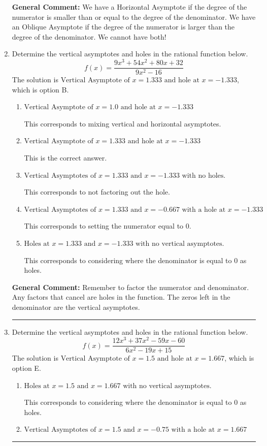 \documentclass{extbook}[14pt]
\newcommand{\litem}[1]{\item #1

\rule{\textwidth}{0.4pt}}
\begin{document}
\begin{enumerate}
{\textbf{General Comment:} We have a Horizontal Asymptote if the degree of the numerator is smaller than or equal to the degree of the denominator. We have an Oblique Asymptote if the degree of the numerator is larger than the degree of the denominator. We cannot have both!
}
\litem{
Determine the vertical asymptotes and holes in the rational function below.
\[ f(x) = \frac{9x^{3} +54 x^{2} +80 x + 32}{9x^{2} -16} \]The solution is \( \text{Vertical Asymptote of } x = 1.333 \text{ and hole at } x = -1.333 \), which is option B.\begin{enumerate}[label=\Alph*.]
\item \( \text{Vertical Asymptote of } x = 1.0 \text{ and hole at } x = -1.333 \)

This corresponds to mixing vertical and horizontal asymptotes.
\item \( \text{Vertical Asymptote of } x = 1.333 \text{ and hole at } x = -1.333 \)

This is the correct answer.
\item \( \text{Vertical Asymptotes of } x = 1.333 \text{ and } x = -1.333 \text{ with no holes.} \)

This corresponds to not factoring out the hole.
\item \( \text{Vertical Asymptotes of } x = 1.333 \text{ and } x = -0.667 \text{ with a hole at } x = -1.333 \)

This corresponds to setting the numerator equal to 0.
\item \( \text{Holes at } x = 1.333 \text{ and } x = -1.333 \text{ with no vertical asymptotes.} \)

This corresponds to considering where the denominator is equal to 0 as holes.
\end{enumerate}

\textbf{General Comment:} Remember to factor the numerator and denominator. Any factors that cancel are holes in the function. The zeros left in the denominator are the vertical asymptotes.
}
\litem{
Determine the vertical asymptotes and holes in the rational function below.
\[ f(x) = \frac{12x^{3} +37 x^{2} -59 x -60}{6x^{2} -19 x + 15} \]The solution is \( \text{Vertical Asymptote of } x = 1.5 \text{ and hole at } x = 1.667 \), which is option E.\begin{enumerate}[label=\Alph*.]
\item \( \text{Holes at } x = 1.5 \text{ and } x = 1.667 \text{ with no vertical asymptotes.} \)

This corresponds to considering where the denominator is equal to 0 as holes.
\item \( \text{Vertical Asymptotes of } x = 1.5 \text{ and } x = -0.75 \text{ with a hole at } x = 1.667 \)


\end{enumerate}}
\end{enumerate}
\end{document}
